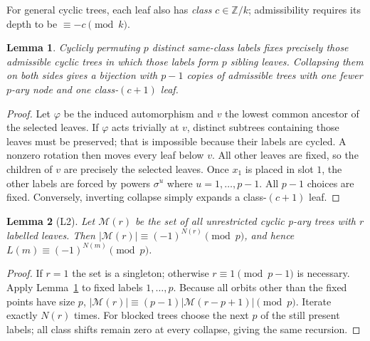 \documentclass[10pt]{article}
\newtheorem{lemma}{Lemma}
\theoremstyle{definition}\newtheorem*{definition}{Definition}
\theoremstyle{remark}\newtheorem*{remark}{Remark}
\begin{document}
For general cyclic trees, each leaf also has \emph{class} $c\in\mathbb Z/k$;
admissibility requires its depth to be $\equiv-c\pmod k$.
\begin{lemma}\label{cherry} Cyclicly permuting $p$ distinct same-class labels
fixes precisely those admissible cyclic trees in which those labels form
$p$ sibling leaves. Collapsing them on both sides gives a bijection with $p-1$
copies of admissible trees with one fewer $p$-ary node and one class-$(c+1)$ leaf.\end{lemma}
\begin{proof} Let $\varphi$ be the induced automorphism and $v$ the lowest common
ancestor of the selected leaves. If $\varphi$ acts trivially at $v$, distinct
subtrees containing those leaves must be preserved; that is impossible because
their labels are cycled. A nonzero rotation then moves every leaf below $v$.
All other leaves are fixed, so the children of $v$ are precisely the selected
leaves. Once $x_1$ is placed in slot $1$, the other labels are forced by powers
$\sigma^u$ where $u=1,\ldots,p-1$. All $p-1$ choices are fixed. Conversely,
inverting collapse simply expands a class-$(c+1)$ leaf.\end{proof}

\begin{lemma}[L2]\label{L2} Let $\mathcal M(r)$ be the set of all unrestricted
cyclic p-ary trees with $r$ labelled leaves. Then
$|\mathcal M(r)|\equiv(-1)^{N(r)}\pmod p$, and hence
$L(m)\equiv(-1)^{N(m)}\pmod p$.\end{lemma}
\begin{proof} If $r=1$ the set is a singleton; otherwise $r\equiv1\pmod{p-1}$
is necessary. Apply Lemma~\ref{cherry} to fixed labels $1,\ldots,p$. Because
all orbits other than the fixed points have size $p$,
$|\mathcal M(r)|\equiv(p-1)|\mathcal M(r-p+1)|\pmod p$. Iterate exactly
$N(r)$ times. For blocked trees choose the next $p$ of the still present labels;
all class shifts remain zero at every collapse, giving the same recursion.\end{proof}
\end{document}
